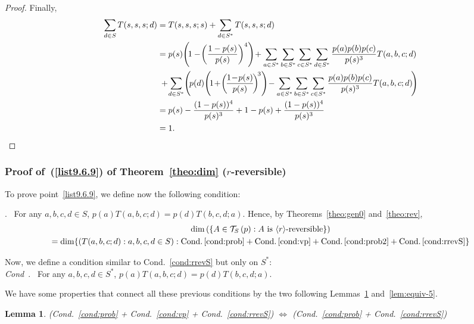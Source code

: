 \documentclass[10pt]{amsart}
\newtheorem{lemm}[theo]{Lemma}\newtheorem{prop}[theo]{Proposition}\newtheorem{coro}[theo]{Corollary}\newtheorem{conj}[theo]{Conjecture}
\theoremstyle{definition}\newtheorem{defi}[theo]{Definition}\newtheorem{rema}[theo]{Remark}\newtheorem{exam}[theo]{Example}\newtheorem{exem}[theo]{Example}\newtheorem{nota}[theo]{Notation}
\DeclarePairedDelimiter{\vect}{\langle}{\rangle}
\newcounter{a}
\newcommand{\Cond}{Cond.}
\newenvironment{cond}{\refstepcounter{a}{\upshape\emph{Cond.~\thea}}\pointir}{}
\newenvironment{condd}{{\upshape\emph{Cond~\thea*}\pointir}}{}
\newcommand{\triang}[2]{\mathcal{T}_{#1} \left(#2 \right)}
\providecommand{\pointir}{.\ }
\begin{document}
\begin{proof}
Finally,
\begin{align*}
\sum_{d \in S} T(s,s,s;d) & = T(s,s,s;s) + \sum_{d \in S^*} T(s,s,s;d) \\
& =p(s)\!\left(\!1 -\!\left(\frac{1-p(s)}{p(s)} \right)^4 \right)\!+ \sum_{a \in S^*} \sum_{b \in S^*} \sum_{c \in S^*} \sum_{d \in S^*} \frac{p(a)p(b)p(c)}{p(s)^3}T(a,b,c;d) \\
&\; +\!\sum_{d \in S^*}\!\left(\!p(d)\!\left(\!1\!+\!\left(\!\frac{1\!-\!p(s)}{p(s)}\!\right)^{\!3}\right)\!- \sum_{a \in S^*} \sum_{b \in S^*} \sum_{c \in S^*} \frac{p(a)p(b)p(c)}{p(s)^3}T(a,b,c;d)\!\right) \\
& = p(s) - \frac{(1-p(s))^4}{p(s)^3} + 1 - p(s) + \frac{(1-p(s))^4}{p(s)^3} \\
& = 1.\mathrlap{\mkern 460mu \qed}
\end{align*}
\let\qed\relax
\end{proof}

\subsubsection{Proof of~(\ref{list9.6.9}) of Theorem~\ref{theo:dim} (\texorpdfstring{$r$}{r}-reversible)} To prove point~\eqref{list9.6.9}, we define now the following condition:

\begin{cond} \label{cond:rrevS}
For any $a,b,c,d \in S$, $p(a) T(a,b,c;d) = p(d) T(b,c,d;a)$.
\end{cond}
Hence, by Theorems~\ref{theo:gen0} and~\ref{theo:rev},
\begin{multline}
\dim \left(\{A \in \triang{S}{p} : \text{$A$ is $\vect{r}$-reversible}\} \right) \label{eq:p5th-1}
\\
= \dim \{(T(a,b,c;d) : a,b,c,d \in S) : \textnormal{\Cond}\,\ref{cond:prob} + \textnormal{\Cond}\,\ref{cond:vp} + \textnormal{\Cond}\,\ref{cond:prob2} + \textnormal{\Cond}\,\ref{cond:rrevS}\}
\end{multline}

Now, we define a condition similar to \Cond~\ref{cond:rrevS} but only on $S^*$:\\
\begin{condd} \label{cond:rrevS*}
For any $a,b,c,d \in S^*$, $p(a) T(a,b,c;d) = p(d) T(b,c,d;a)$.
\end{condd}

We have some properties that connect all these previous conditions by the two following Lemmas~\ref{lemm9.10} and~\ref{lem:equiv-5}.
\begin{lemm}\label{lemm9.10}
(\Cond~\ref{cond:prob} + \Cond~\ref{cond:vp} + \Cond~\ref{cond:rrevS}) $\Leftrightarrow$ (\Cond~\ref{cond:prob} + \Cond~\ref{cond:rrevS})
\end{lemm}
\end{document}
